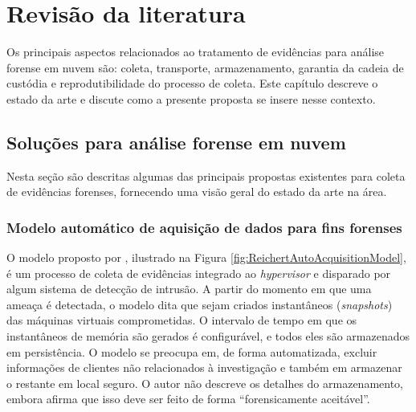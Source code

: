 \chapter{Revisão da literatura}
\label{chp:revisão}

Os principais aspectos relacionados ao tratamento de evidências para análise forense em nuvem são: coleta, transporte, armazenamento, garantia da cadeia de custódia e reprodutibilidade do processo de coleta. 
%
Este capítulo descreve o estado da arte e discute como a presente proposta se insere nesse contexto.


\section{Soluções para análise forense em nuvem}
\label{sec:estadodaarte}


Nesta seção são descritas algumas das principais propostas existentes para coleta de evidências forenses, fornecendo uma visão geral do estado da arte na área.

\subsection{Modelo automático de aquisição de dados para fins forenses}
\label{sec:aquisicaoautomatica}


O modelo proposto por \cite{ReichertAutoAcquisition:2015}, ilustrado na Figura \ref{fig:ReichertAutoAcquisitionModel}, é um processo de coleta de evidências integrado ao \textit{hypervisor} e disparado por algum sistema de detecção de intrusão. 
%
A partir do momento em que uma ameaça é detectada, o modelo dita que sejam criados instantâneos (\textit{snapshots}) das máquinas virtuais comprometidas. 
%
O intervalo de tempo em que os instantâneos de memória são gerados é configurável, e todos eles são armazenados em persistência.
%
O modelo se preocupa em, de forma automatizada, excluir informações de clientes não relacionados à investigação e também em armazenar o restante em local seguro.
%
O autor não descreve os detalhes do armazenamento, embora afirma que isso deve ser feito de forma ``forensicamente aceitável''.


